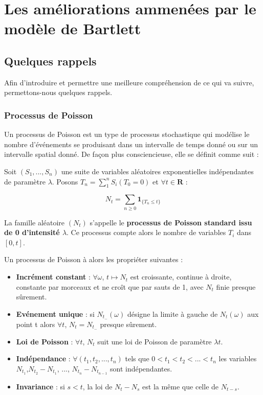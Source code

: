 \section{Les améliorations ammenées par le modèle de Bartlett}

\subsection{Quelques rappels}
Afin d'introduire et permettre une meilleure compréhension de ce qui va suivre, permettons-nous quelques rappels.

\subsubsection{Processus de Poisson}
Un processus de Poisson est un type de processus stochastique qui modélise le nombre d'événements se produisant dans un intervalle de temps donné ou sur un intervalle spatial donné.
De façon plus consciencieuse, elle se définit comme suit :

Soit $(S_1, ..., S_n)$ une suite de variables aléatoires exponentielles indépendantes de paramètre $\lambda$. Posons $T_n = \sum^n_1 S_i (T_0 = 0)$ et $\forall t \in \boldsymbol{R}$ :

\begin{center}
    $$ N_t = \sum_{n \geq 0} \boldsymbol{1}_{\{T_n \leq t \}} $$
\end{center}

La famille aléatoire $(N_t)$ s'appelle le \textbf{processus de Poisson standard issu de 0 d'intensité $\lambda$}. Ce processus compte alors le nombre de variables $T_i$ dans $[0, t]$.

Un processus de Poisson à alors les propriéter suivantes :
	\begin{itemize}[label=$\bullet$]
    	\item \textbf{Incrément constant} : $\forall \omega$, $t \mapsto N_t$ est croissante, continue à droite, constante par morceaux et ne croît que par sauts de 1, avec  $N_t$ finie presque sûrement.
    	\item \textbf{Evénement unique} : si $N_{t_-}(\omega)$ désigne la limite à gauche de $N_t(\omega)$ aux point t alors $\forall t$, $N_t = N_{t_-}$ presque sûrement.  	
    	\item \textbf{Loi de Poisson} : $\forall t$, $N_t$ suit une loi de Poisson de paramètre $\lambda t$.
    	\item \textbf{Indépendance} : $\forall (t_1, t_2, ..., t_n)$ tels que $0 < t_1 < t_2 < ... < t_n$ les variables $N_{t_1}$,$N_{t_2} - N_{t_1}$, ..., $N_{t_n} - N_{t_{n-1}}$ sont indépendantes.
    	 \item \textbf{Invariance} : si $s < t$, la loi de $N_t - N_s$ est la même que celle de $N_{t - s}$.
    	 \end{itemize}

